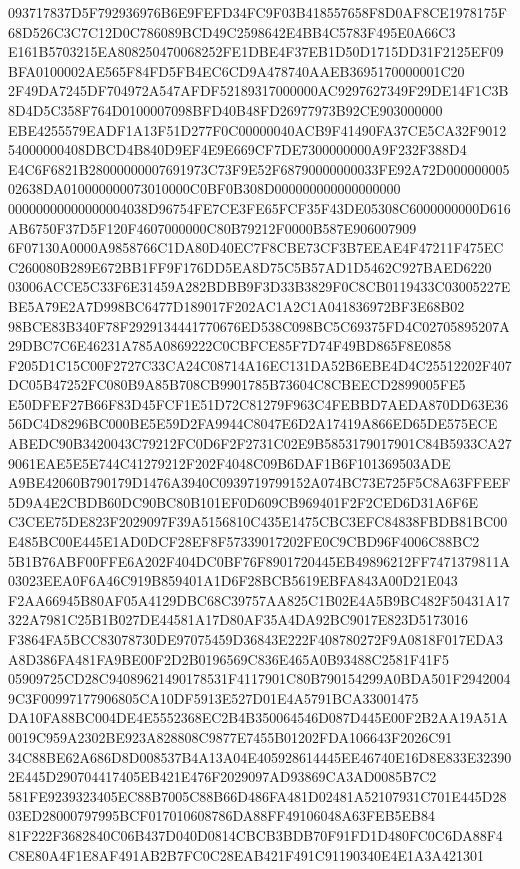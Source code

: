 \documentclass[UTF8,fontset=fandol,zihao=-4,a4paper]{ctexart}
\begin{document}
{{093717837D5F792936976B6E9FEFD34FC9F03B418557658F8D0AF8CE1978175F68D526C3C7C12D0C786089BCD49C2598642E4BB4C5783F495E0A66C3
E161B5703215EA808250470068252FE1DBE4F37EB1D50D1715DD31F2125EF09BFA0100002AE565F84FD5FB4EC6CD9A478740AAEB3695170000001C20
2F49DA7245DF704972A547AFDF52189317000000AC9297627349F29DE14F1C3B8D4D5C358F764D0100007098BFD40B48FD26977973B92CE903000000
EBE4255579EADF1A13F51D277F0C00000040ACB9F41490FA37CE5CA32F901254000000408DBCD4B840D9EF4E9E669CF7DE7300000000A9F232F388D4
E4C6F6821B28000000007691973C73F9E52F68790000000033FE92A72D00000000502638DA010000000073010000C0BF0B308D000000000000000000
00000000000000004038D96754FE7CE3FE65FCF35F43DE05308C6000000000D616AB6750F37D5F120F4607000000C80B79212F0000B587E906007909
6F07130A0000A9858766C1DA80D40EC7F8CBE73CF3B7EEAE4F47211F475ECC260080B289E672BB1FF9F176DD5EA8D75C5B57AD1D5462C927BAED6220
03006ACCE5C33F6E31459A282BDBB9F3D33B3829F0C8CB0119433C03005227EBE5A79E2A7D998BC6477D189017F202AC1A2C1A041836972BF3E68B02
98BCE83B340F78F2929134441770676ED538C098BC5C69375FD4C02705895207A29DBC7C6E46231A785A0869222C0CBFCE85F7D74F49BD865F8E0858
F205D1C15C00F2727C33CA24C08714A16EC131DA52B6EBE4D4C25512202F407DC05B47252FC080B9A85B708CB9901785B73604C8CBEECD2899005FE5
E50DFEF27B66F83D45FCF1E51D72C81279F963C4FEBBD7AEDA870DD63E3656DC4D8296BC000BE5E59D2FA9944C8047E6D2A17419A866ED65DE575ECE
ABEDC90B3420043C79212FC0D6F2F2731C02E9B5853179017901C84B5933CA279061EAE5E5E744C41279212F202F4048C09B6DAF1B6F101369503ADE
A9BE42060B790179D1476A3940C0939719799152A074BC73E725F5C8A63FFEEF5D9A4E2CBDB60DC90BC80B101EF0D609CB969401F2F2CED6D31A6F6E
C3CEE75DE823F2029097F39A5156810C435E1475CBC3EFC84838FBDB81BC00E485BC00E445E1AD0DCF28EF8F57339017202FE0C9CBD96F4006C88BC2
5B1B76ABF00FFE6A202F404DC0BF76F8901720445EB49896212FF7471379811A03023EEA0F6A46C919B859401A1D6F28BCB5619EBFA843A00D21E043
F2AA66945B80AF05A4129DBC68C39757AA825C1B02E4A5B9BC482F50431A17322A7981C25B1B027DE44581A17D80AF35A4DA92BC9017E823D5173016
F3864FA5BCC83078730DE97075459D36843E222F408780272F9A0818F017EDA3A8D386FA481FA9BE00F2D2B0196569C836E465A0B93488C2581F41F5
05909725CD28C94089621490178531F4117901C80B790154299A0BDA501F29420049C3F00997177906805CA10DF5913E527D01E4A5791BCA33001475
DA10FA88BC004DE4E5552368EC2B4B350064546D087D445E00F2B2AA19A51A0019C959A2302BE923A828808C9877E7455B01202FDA106643F2026C91
34C88BE62A686D8D008537B4A13A04E405928614445EE46740E16D8E833E323902E445D290704417405EB421E476F2029097AD93869CA3AD0085B7C2
581FE9239323405EC88B7005C88B66D486FA481D02481A52107931C701E445D2803ED28000797995BCF017010608786DA88FF49106048A63FEB5EB84
81F222F3682840C06B437D040D0814CBCB3BDB70F91FD1D480FC0C6DA88F4C8E80A4F1E8AF491AB2B7FC0C28EAB421F491C91190340E4E1A3A421301
}}
\end{document}
